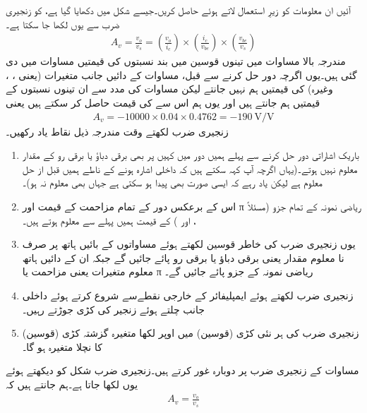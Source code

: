 آئیں ان معلومات کو زیرِ استعمال لاتے ہوئے  حاصل کریں۔جیسے شکل   میں دکھایا گیا ہے،  کو زنجیری ضرب سے یوں لکھا جا سکتا ہے۔
\begin{align} \label{مساوات_ٹرانزسٹر_زنجیری_ضرب_مثال_الف}
A_v =\frac{v_o}{v_s}= \left (\frac{v_o}{i_c} \right) \times \left (\frac{i_c}{v_{be}} \right)   \times \left (\frac{v_{be}}{v_s} \right) 
\end{align}
مندرجہ بالا مساوات میں تینوں قوسین میں بند نسبتوں کی قیمتیں مساوات   میں دی گئی ہیں۔یوں اگرچہ دور حل کرنے سے قبل، مساوات   کے دائیں جانب متغیرات (یعنی ، ،  وغیرہ) کی قیمتیں ہم نہیں جانتے لیکن مساوات   کی مدد سے ان تینوں نسبتوں کے قیمتیں ہم جانتے ہیں اور یوں ہم اس سے  کی قیمت حاصل کر سکتے ہیں یعنی
\begin{align}
A_v = -10000  \times 0.04  \times 0.4762 =\SI{-190}{\volt \per \volt}
\end{align}
	زنجیری ضرب لکھتے وقت مندرجہ ذیل نقاط یاد رکھیں۔
\begin{enumerate}
\item
باریک اشاراتی دور حل کرنے سے پہلے ہمیں دور میں کہیں پر بھی برقی دباؤ یا برقی رو کے مقدار معلوم نہیں ہوتے۔(یہاں اگرچہ آپ کہہ سکتے ہیں کہ  داخلی اشارہ ہونے کے ناطے ہمیں قبل از حل معلوم ہے لیکن یاد رہے کہ ایسی صورت بھی پیدا ہو سکتی ہے جہاں  بھی معلوم نہ ہو)۔
\item
اس کے برعکس دور کے تمام مزاحمت کے قیمت اور π ریاضی نمونہ  کے تمام جزو  (مسئلاً  ،  اور  ) کے قیمت ہمیں پہلے سے معلوم ہوتے ہیں۔
\item
یوں زنجیری ضرب کی خاطر قوسین لکھتے ہوئے مساواتوں کے بائیں ہاتھ پر صرف نا معلوم مقدار یعنی برقی دباؤ یا برقی رو پائے جائیں گے جبکہ ان کے دائیں ہاتھ معلوم متغیرات یعنی مزاحمت یا π ریاضی نمونہ  کے جزو پائے جائیں گے۔
\item
زنجیری ضرب لکھتے ہوئے ایمپلیفائر کے خارجی نقطےسے شروع کرتے ہوئے داخلی جانب چلتے ہوئے زنجیر کی کڑی جوڑتے رہیں۔
\item
زنجیری ضرب کی ہر نئی کڑی (قوسین) میں اوپر لکھا متغیرہ گزشتہ کڑی (قوسین) کا 	نچلا متغیرہ ہو گا۔
\end{enumerate}
	مساوات   کے زنجیری ضرب پر دوبارہ غور کرتے ہیں۔زنجیری ضرب شکل   کو دیکھتے ہوئے یوں لکھا جاتا ہے۔ہم جانتے ہیں کہ
\begin{align*}
A_v=\frac{v_o}{v_s}
\end{align*}
